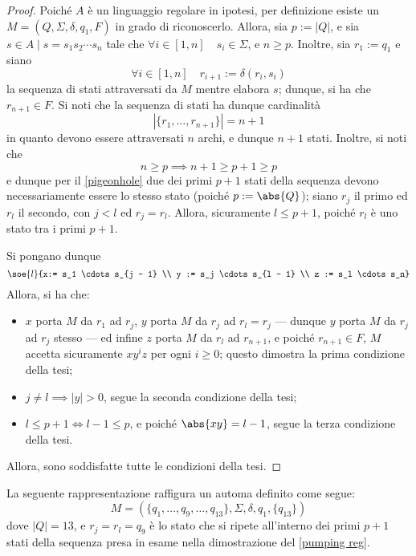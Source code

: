 \documentclass[a4paper, 12pt]{report}
\begin{document}
    \begin{proof}
        Poiché $A$ è un linguaggio regolare in ipotesi, per definizione esiste un \DFA $M = (Q, \Sigma, \delta, q_1, F)$ in grado di riconoscerlo. Allora, sia $p := |Q|$, e sia $s \in A \mid s = s_1 s_2 \cdots s_n$ tale che $\forall i \in [1, n] \quad s_i \in \Sigma$, e $n \ge p$. Inoltre, sia $r_1 := q_1$ e siano $$\forall i \in [1, n] \quad r_{i + 1} := \delta(r_i, s_i)$$ la sequenza di stati attraversati da $M$ mentre elabora $s$; dunque, si ha che $r_{n + 1} \in F$. Si noti che la sequenza di stati ha dunque cardinalità $$|\{r_1, \ldots, r_{n + 1}\}| = n + 1$$ in quanto devono essere attraversati $n$ archi, e dunque $n + 1$ stati. Inoltre, si noti che $$n \ge p \implies n + 1 \ge p + 1 \ge p$$ e dunque per il \cref{pigeonhole} due dei primi $p + 1$ stati della sequenza devono necessariamente essere lo stesso stato (poiché $p := \abs{Q}$); siano $r_j$ il primo ed $r_l$ il secondo, con $j < l$ ed $r_j = r_l$. Allora, sicuramente $l \le p + 1$, poiché $r_l$ è uno stato tra i primi $p + 1$.

        Si pongano dunque $$\soe{l}{x:= s_1 \cdots s_{j - 1} \\ y := s_j \cdots s_{l - 1} \\ z := s_l \cdots s_n}$$ Allora, si ha che:

        \begin{itemize}
            \item $x$ porta $M$ da $r_1$ ad $r_j$, $y$ porta $M$ da $r_j$ ad $r_l = r_j$ --- dunque $y$ porta $M$ da $r_j$ ad $r_j$ stesso --- ed infine $z$ porta $M$ da $r_l$ ad $r_{n + 1}$, e poiché $r_{n + 1} \in F$, $M$ accetta sicuramente $xy^iz$ per ogni $i \ge 0$; questo dimostra la prima condizione della tesi;
            \item $j \neq l \implies |y| > 0$, segue la seconda condizione della tesi;
            \item $l \le p + 1 \iff l - 1 \le p$, e poiché $\abs{xy} = l - 1$, segue la terza condizione della tesi.
        \end{itemize}

        Allora, sono soddisfatte tutte le condizioni della tesi.
    \end{proof}

    \begin{example}
        La seguente rappresentazione raffigura un automa definito come segue: $$M = (\{q_1, \ldots, q_9, \ldots, q_{13}\}, \Sigma, \delta, q_1, \{q_{13}\})$$ dove $|Q| = 13$, e $r_j = r_l = q_9$ è lo stato che si ripete all'interno dei primi $p + 1$ stati della sequenza presa in esame nella dimostrazione del \cref{pumping reg}.

    \end{example}
\end{document}
